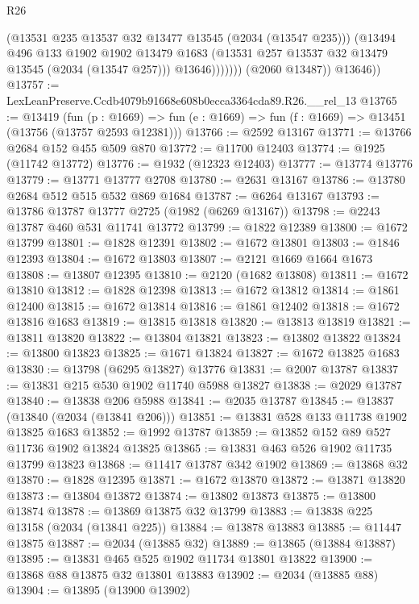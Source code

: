 \begin{lexlean}{R26}
\begin{coremodule}
                      (@13531 @235 @13537 @32 @13477 @13545 (@2034 (@13547 @235)))
                      (@13494
                        @496
                        @133
                        @1902
                        @1902
                        @13479
                        @1683
                        (@13531 @257 @13537 @32 @13479 @13545 (@2034 (@13547 @257)))
                        @13646)))))))
          (@2060 @13487))
        @13646))
@13757 := LexLeanPreserve.Ccdb4079b91668e608b0ecca3364cda89.R26.__rel_13
@13765 := @13419
    (fun (p : @1669) => fun (e : @1669) => fun (f : @1669) => @13451 (@13756 (@13757 @2593 @12381)))
@13766 := @2592 @13167
@13771 := @13766 @2684 @152 @455 @509 @870
@13772 := @11700 @12403
@13774 := @1925 (@11742 @13772)
@13776 := @1932 (@12323 @12403)
@13777 := @13774 @13776
@13779 := @13771 @13777 @2708
@13780 := @2631 @13167
@13786 := @13780 @2684 @512 @515 @532 @869 @1684
@13787 := @6264 @13167
@13793 := @13786 @13787 @13777 @2725 (@1982 (@6269 @13167))
@13798 := @2243 @13787 @460 @531 @11741 @13772
@13799 := @1822 @12389
@13800 := @1672 @13799
@13801 := @1828 @12391
@13802 := @1672 @13801
@13803 := @1846 @12393
@13804 := @1672 @13803
@13807 := @2121 @1669 @1664 @1673
@13808 := @13807 @12395
@13810 := @2120 (@1682 @13808)
@13811 := @1672 @13810
@13812 := @1828 @12398
@13813 := @1672 @13812
@13814 := @1861 @12400
@13815 := @1672 @13814
@13816 := @1861 @12402
@13818 := @1672 @13816 @1683
@13819 := @13815 @13818
@13820 := @13813 @13819
@13821 := @13811 @13820
@13822 := @13804 @13821
@13823 := @13802 @13822
@13824 := @13800 @13823
@13825 := @1671 @13824
@13827 := @1672 @13825 @1683
@13830 := @13798 (@6295 @13827) @13776
@13831 := @2007 @13787
@13837 := @13831 @215 @530 @1902 @11740 @5988 @13827
@13838 := @2029 @13787
@13840 := @13838 @206 @5988
@13841 := @2035 @13787
@13845 := @13837 (@13840 (@2034 (@13841 @206)))
@13851 := @13831 @528 @133 @11738 @1902 @13825 @1683
@13852 := @1992 @13787
@13859 := @13852 @152 @89 @527 @11736 @1902 @13824 @13825
@13865 := @13831 @463 @526 @1902 @11735 @13799 @13823
@13868 := @11417 @13787 @342 @1902
@13869 := @13868 @32
@13870 := @1828 @12395
@13871 := @1672 @13870
@13872 := @13871 @13820
@13873 := @13804 @13872
@13874 := @13802 @13873
@13875 := @13800 @13874
@13878 := @13869 @13875 @32 @13799
@13883 := @13838 @225 @13158 (@2034 (@13841 @225))
@13884 := @13878 @13883
@13885 := @11447 @13875
@13887 := @2034 (@13885 @32)
@13889 := @13865 (@13884 @13887)
@13895 := @13831 @465 @525 @1902 @11734 @13801 @13822
@13900 := @13868 @88 @13875 @32 @13801 @13883
@13902 := @2034 (@13885 @88)
@13904 := @13895 (@13900 @13902)

\end{coremodule}
\end{lexlean}
